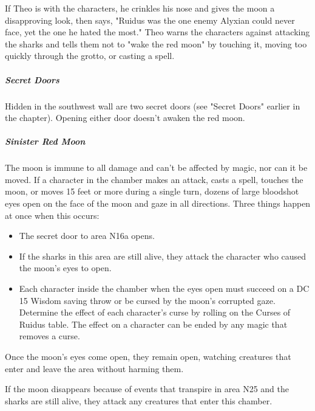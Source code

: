 \documentclass[10pt,a4paper,twoside,fancy,bg=print,twocolumn,openany,nodeprecatedcode]{dndbook}
\begin{document}
If Theo is with the characters, he crinkles his nose and gives the moon a disapproving look, then says, "Ruidus was the one enemy Alyxian could never face, yet the one he hated the most." Theo warns the characters against attacking the sharks and tells them not to "wake the red moon" by touching it, moving too quickly through the grotto, or casting a spell.

\subparagraph{Secret Doors}
Hidden in the southwest wall are two secret doors (see "Secret Doors" earlier in the chapter). Opening either door doesn't awaken the red moon.

\subparagraph{Sinister Red Moon}
The moon is immune to all damage and can't be affected by magic, nor can it be moved. If a character in the chamber makes an attack, casts a spell, touches the moon, or moves 15 feet or more during a single turn, dozens of large bloodshot eyes open on the face of the moon and gaze in all directions. Three things happen at once when this occurs:


\begin{itemize}
\item The secret door to area N16a opens.
\item If the sharks in this area are still alive, they attack the character who caused the moon's eyes to open.
\item Each character inside the chamber when the eyes open must succeed on a DC 15 Wisdom saving throw or be cursed by the moon's corrupted gaze. Determine the effect of each character's curse by rolling on the Curses of Ruidus table. The effect on a character can be ended by any magic that removes a curse.
\end{itemize}

Once the moon's eyes come open, they remain open, watching creatures that enter and leave the area without harming them.

If the moon disappears because of events that transpire in area N25 and the sharks are still alive, they attack any creatures that enter this chamber.
\end{document}
